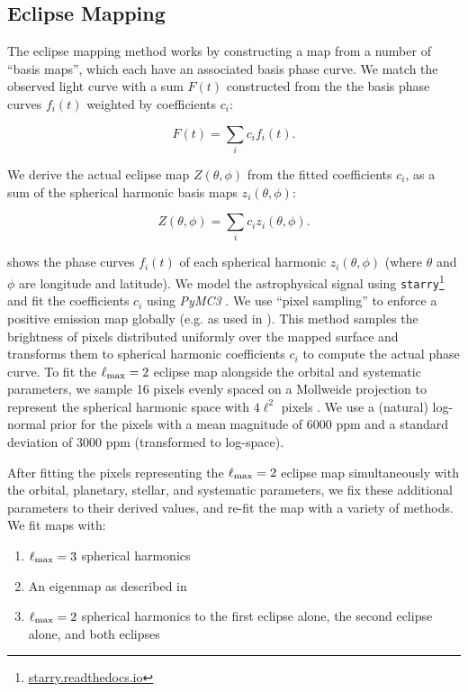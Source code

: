 \documentclass[twocolumn]{aastex631}
\begin{document}
\subsection{Eclipse Mapping}

The eclipse mapping method works by constructing a map from a number of ``basis maps'', which each have an associated basis phase curve. We match the observed light curve with a sum $F(t)$ constructed from the the basis phase curves $f_{i}(t)$ weighted by coefficients $c_{i}$:

\begin{equation}\label{eqn:fit-curve}
F(t) = \sum_{i} c_{i} f_{i}(t).
\end{equation}

We derive the actual eclipse map $Z(\theta,\phi)$ from the fitted coefficients $c_{i}$, as a sum of the spherical harmonic basis maps $z_{i}(\theta,\phi)$: 

\begin{equation}
Z(\theta,\phi) = \sum_{i} c_{i} z_{i}(\theta,\phi).
\end{equation}

\citet{luger2019starry} shows the phase curves $f_{i}(t)$ of each spherical harmonic $z_{i}(\theta,\phi)$ (where $\theta$ and $\phi$ are longitude and latitude). We model the astrophysical signal using \texttt{starry}\footnote{\url{starry.readthedocs.io}} \citep{luger2019starry} and fit the coefficients $c_{i}$ using \textit{PyMC3} \citep{salvatier2016probabilistic}. We use ``pixel sampling'' to enforce a positive emission map globally (e.g. as used in \citet{gorski2005healpix}). This method samples the brightness of pixels distributed uniformly over the mapped surface and transforms them to spherical harmonic coefficients $c_{i}$ to compute the actual phase curve. To fit the $\ell_{\rm max}=2$ eclipse map alongside the orbital and systematic parameters, we sample 16 pixels evenly spaced on a Mollweide projection to represent the spherical harmonic space with $4\ell^{2}$ pixels \citep{mcewen2011novel}. We use a (natural) log-normal prior for the pixels with a mean magnitude of 6000 ppm and a standard deviation of 3000 ppm (transformed to log-space).

After fitting the pixels representing the $\ell_{\rm max}=2$ eclipse map simultaneously with the orbital, planetary, stellar, and systematic parameters, we fix these additional parameters to their derived values, and re-fit the map with a variety of methods. We fit maps with:

\begin{enumerate}
    \item $\ell_{\rm max}=3$ spherical harmonics
    \item An eigenmap as described in \citet{rauscher2018eigenmap}
    \item $\ell_{\rm max}=2$ spherical harmonics to the first eclipse alone, the second eclipse alone, and both eclipses
\end{enumerate}
\end{document}
